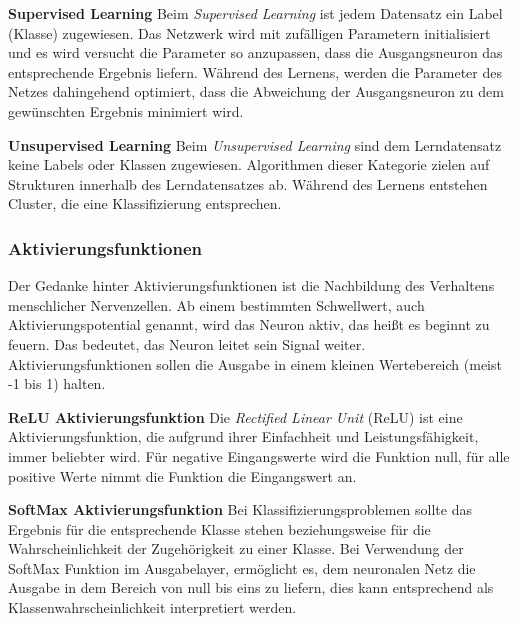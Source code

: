 \documentclass[11pt]{article}
\begin{document}
\textbf{Supervised Learning}\newline
Beim \textit{Supervised Learning} ist jedem Datensatz ein Label (Klasse) zugewiesen. Das Netzwerk wird mit zufälligen Parametern initialisiert und es wird versucht die Parameter so anzupassen, dass die Ausgangsneuron das entsprechende Ergebnis liefern. Während des Lernens, werden die Parameter des Netzes dahingehend optimiert, dass die Abweichung der Ausgangsneuron zu dem gewünschten Ergebnis minimiert wird.\parencite{Pattanayak2017}

\textbf{Unsupervised Learning}\newline
Beim \textit{Unsupervised Learning} sind dem Lerndatensatz keine Labels oder Klassen zugewiesen. Algorithmen dieser Kategorie zielen auf Strukturen innerhalb des Lerndatensatzes ab. Während des Lernens entstehen Cluster, die eine Klassifizierung entsprechen.\parencite{Pattanayak2017}

\subsubsection{Aktivierungsfunktionen}
Der Gedanke hinter Aktivierungsfunktionen ist die Nachbildung des Verhaltens menschlicher Nervenzellen. Ab einem bestimmten Schwellwert, auch Aktivierungspotential  genannt, wird das Neuron aktiv, das heißt es beginnt zu feuern. Das bedeutet, das Neuron leitet sein Signal weiter. Aktivierungsfunktionen sollen die Ausgabe in einem kleinen Wertebereich (meist -1 bis 1) halten.\parencite{Manaswi2018}

\textbf{ReLU Aktivierungsfunktion}\newline
Die \textit{Rectified Linear Unit} (ReLU) ist eine Aktivierungsfunktion, die aufgrund ihrer Einfachheit und Leistungsfähigkeit, immer beliebter wird. Für negative Eingangswerte wird die Funktion null, für alle positive Werte nimmt die Funktion die Eingangswert an.\parencite{M.AnderssonM.Arvola}

\textbf{SoftMax Aktivierungsfunktion}\newline
Bei Klassifizierungsproblemen sollte das Ergebnis für die entsprechende Klasse stehen beziehungsweise für die Wahrscheinlichkeit der Zugehörigkeit zu einer Klasse. Bei Verwendung der SoftMax Funktion im Ausgabelayer, ermöglicht es, dem neuronalen Netz die Ausgabe in dem Bereich von null bis eins zu liefern, dies kann entsprechend als Klassenwahrscheinlichkeit interpretiert werden.\parencite{AndreasLindholmNiklasWahlstromFredrikLindsten2019}
\end{document}
